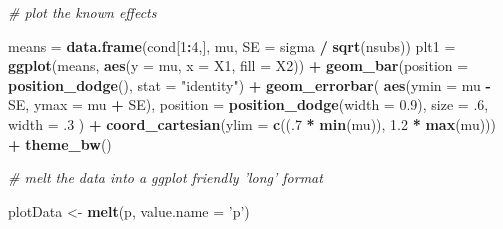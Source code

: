 \documentclass[]{book}
\newenvironment{Shaded}{\begin{snugshade}}{\end{snugshade}}
\newcommand{\CommentTok}[1]{\textcolor[rgb]{0.56,0.35,0.01}{\textit{#1}}}
\newcommand{\DataTypeTok}[1]{\textcolor[rgb]{0.13,0.29,0.53}{#1}}
\newcommand{\DecValTok}[1]{\textcolor[rgb]{0.00,0.00,0.81}{#1}}
\newcommand{\FloatTok}[1]{\textcolor[rgb]{0.00,0.00,0.81}{#1}}
\newcommand{\KeywordTok}[1]{\textcolor[rgb]{0.13,0.29,0.53}{\textbf{#1}}}
\newcommand{\NormalTok}[1]{#1}
\newcommand{\OperatorTok}[1]{\textcolor[rgb]{0.81,0.36,0.00}{\textbf{#1}}}
\newcommand{\StringTok}[1]{\textcolor[rgb]{0.31,0.60,0.02}{#1}}
\begin{document}
\begin{Shaded}
\begin{Highlighting}[]
\CommentTok{# plot the known effects}

 
\NormalTok{means =}\StringTok{ }\KeywordTok{data.frame}\NormalTok{(cond[}\DecValTok{1}\OperatorTok{:}\DecValTok{4}\NormalTok{,], mu, }\DataTypeTok{SE =}\NormalTok{ sigma }\OperatorTok{/}\StringTok{ }\KeywordTok{sqrt}\NormalTok{(nsubs))}
\NormalTok{plt1 =}\StringTok{ }\KeywordTok{ggplot}\NormalTok{(means, }\KeywordTok{aes}\NormalTok{(}\DataTypeTok{y =}\NormalTok{ mu, }\DataTypeTok{x =}\NormalTok{ X1, }\DataTypeTok{fill =}\NormalTok{ X2)) }\OperatorTok{+}
\KeywordTok{geom_bar}\NormalTok{(}\DataTypeTok{position =} \KeywordTok{position_dodge}\NormalTok{(), }\DataTypeTok{stat =} \StringTok{"identity"}\NormalTok{) }\OperatorTok{+}
\KeywordTok{geom_errorbar}\NormalTok{(}
\KeywordTok{aes}\NormalTok{(}\DataTypeTok{ymin =}\NormalTok{ mu }\OperatorTok{-}\StringTok{ }\NormalTok{SE, }\DataTypeTok{ymax =}\NormalTok{ mu }\OperatorTok{+}\StringTok{ }\NormalTok{SE),}
\DataTypeTok{position =} \KeywordTok{position_dodge}\NormalTok{(}\DataTypeTok{width =} \FloatTok{0.9}\NormalTok{),}
\DataTypeTok{size =} \FloatTok{.6}\NormalTok{,}
\DataTypeTok{width =} \FloatTok{.3}
\NormalTok{) }\OperatorTok{+}
\KeywordTok{coord_cartesian}\NormalTok{(}\DataTypeTok{ylim =} \KeywordTok{c}\NormalTok{((.}\DecValTok{7} \OperatorTok{*}\StringTok{ }\KeywordTok{min}\NormalTok{(mu)), }\FloatTok{1.2} \OperatorTok{*}\StringTok{ }\KeywordTok{max}\NormalTok{(mu))) }\OperatorTok{+}
\KeywordTok{theme_bw}\NormalTok{()}

\CommentTok{# melt the data into a ggplot friendly 'long' format}

\NormalTok{plotData <-}\StringTok{ }\KeywordTok{melt}\NormalTok{(p, }\DataTypeTok{value.name =} \StringTok{'p'}\NormalTok{)}


\end{Highlighting}
\end{Shaded}
\end{document}
